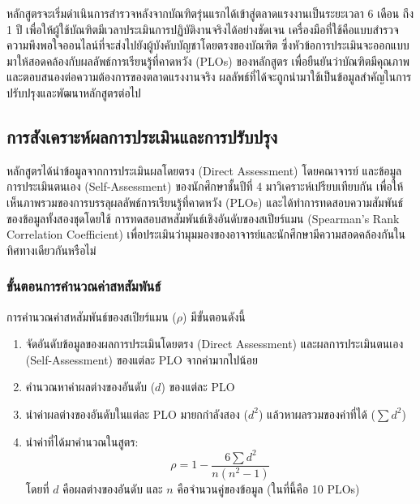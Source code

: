หลักสูตรจะเริ่มดำเนินการสำรวจหลังจากบัณฑิตรุ่นแรกได้เข้าสู่ตลาดแรงงานเป็นระยะเวลา 6 เดือน ถึง 1 ปี เพื่อให้ผู้ใช้บัณฑิตมีเวลาประเมินการปฏิบัติงานจริงได้อย่างชัดเจน เครื่องมือที่ใช้คือแบบสำรวจความพึงพอใจออนไลน์ที่จะส่งไปยังผู้บังคับบัญชาโดยตรงของบัณฑิต ซึ่งหัวข้อการประเมินจะออกแบบมาให้สอดคล้องกับผลลัพธ์การเรียนรู้ที่คาดหวัง (PLOs) ของหลักสูตร เพื่อยืนยันว่าบัณฑิตมีคุณภาพและตอบสนองต่อความต้องการของตลาดแรงงานจริง ผลลัพธ์ที่ได้จะถูกนำมาใช้เป็นข้อมูลสำคัญในการปรับปรุงและพัฒนาหลักสูตรต่อไป


\subsection*{การสังเคราะห์ผลการประเมินและการปรับปรุง}

 
หลักสูตรได้นำข้อมูลจากการประเมินผลโดยตรง (Direct Assessment) โดยคณาจารย์ และข้อมูลการประเมินตนเอง (Self-Assessment) ของนักศึกษาชั้นปีที่ 4 มาวิเคราะห์เปรียบเทียบกัน เพื่อให้เห็นภาพรวมของการบรรลุผลลัพธ์การเรียนรู้ที่คาดหวัง (PLOs) และได้ทำการทดสอบความสัมพันธ์ของข้อมูลทั้งสองชุดโดยใช้ การทดสอบสหสัมพันธ์เชิงอันดับของสเปียร์แมน (Spearman's Rank Correlation Coefficient) เพื่อประเมินว่ามุมมองของอาจารย์และนักศึกษามีความสอดคล้องกันในทิศทางเดียวกันหรือไม่

\subsubsection*{ขั้นตอนการคำนวณค่าสหสัมพันธ์}
การคำนวณค่าสหสัมพันธ์ของสเปียร์แมน ($\rho$) มีขั้นตอนดังนี้
\begin{enumerate}
	\item จัดอันดับข้อมูลของผลการประเมินโดยตรง (Direct Assessment) และผลการประเมินตนเอง (Self-Assessment) ของแต่ละ PLO จากค่ามากไปน้อย
	\item คำนวณหาค่าผลต่างของอันดับ ($d$) ของแต่ละ PLO
	\item นำค่าผลต่างของอันดับในแต่ละ PLO มายกกำลังสอง ($d^2$) แล้วหาผลรวมของค่าที่ได้ ($\sum d^2$)
	\item นำค่าที่ได้มาคำนวณในสูตร:
    $$\rho = 1 - \frac{6 \sum d^2}{n(n^2 - 1)}$$
    โดยที่ $d$ คือผลต่างของอันดับ และ $n$ คือจำนวนคู่ของข้อมูล (ในที่นี้คือ 10 PLOs)
\end{enumerate}


